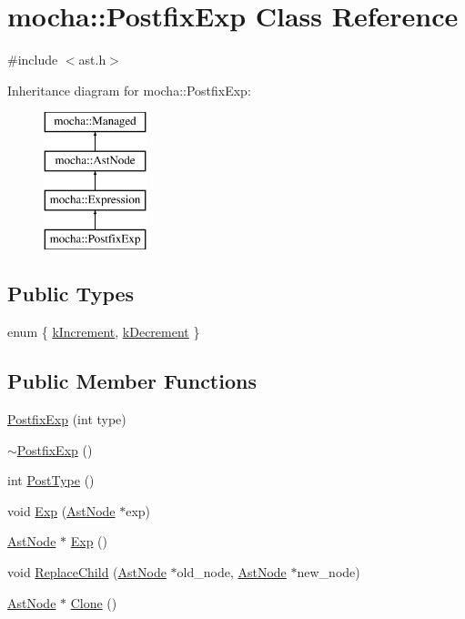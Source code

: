 \hypertarget{classmocha_1_1_postfix_exp}{
\section{mocha::PostfixExp Class Reference}
\label{classmocha_1_1_postfix_exp}
}


{\ttfamily \#include $<$ast.h$>$}

Inheritance diagram for mocha::PostfixExp:\begin{figure}[H]
\begin{center}
\leavevmode
\includegraphics[height=4.000000cm]{classmocha_1_1_postfix_exp}
\end{center}
\end{figure}
\subsection*{Public Types}
\begin{DoxyCompactItemize}
\item 
enum \{ \hyperlink{classmocha_1_1_postfix_exp_a7e0174b68da1e5342caa9ce316407713a5dec78060a214a2c4dba6828f66b4585}{kIncrement}, 
\hyperlink{classmocha_1_1_postfix_exp_a7e0174b68da1e5342caa9ce316407713a3a197810ea215cded0a4074a90a8382a}{kDecrement}
 \}
\end{DoxyCompactItemize}
\subsection*{Public Member Functions}
\begin{DoxyCompactItemize}
\item 
\hyperlink{classmocha_1_1_postfix_exp_a2cfb0a8d5b5f415cdd820984103c001a}{PostfixExp} (int type)
\item 
\hyperlink{classmocha_1_1_postfix_exp_a7b19c8eecba9072594df8e8fccebd6e0}{$\sim$PostfixExp} ()
\item 
int \hyperlink{classmocha_1_1_postfix_exp_a6add3cf44ddc5f26dceec66f49ec9f14}{PostType} ()
\item 
void \hyperlink{classmocha_1_1_postfix_exp_a80477d2caa919fcfe3ee669e0a4a6f36}{Exp} (\hyperlink{classmocha_1_1_ast_node}{AstNode} $\ast$exp)
\item 
\hyperlink{classmocha_1_1_ast_node}{AstNode} $\ast$ \hyperlink{classmocha_1_1_postfix_exp_ab8d8dc1afcbe4201695a460e93b7eaf5}{Exp} ()
\item 
void \hyperlink{classmocha_1_1_postfix_exp_acdb52acdc2b5520961b07a3ece36eb41}{ReplaceChild} (\hyperlink{classmocha_1_1_ast_node}{AstNode} $\ast$old\_\-node, \hyperlink{classmocha_1_1_ast_node}{AstNode} $\ast$new\_\-node)
\item 
\hyperlink{classmocha_1_1_ast_node}{AstNode} $\ast$ \hyperlink{classmocha_1_1_postfix_exp_a71df055d09b8f804d8eeeb4ea12a72ad}{Clone} ()
\end{DoxyCompactItemize}
